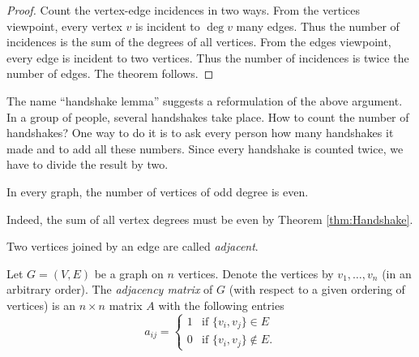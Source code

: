 \begin{page}
\setcounter{section}{1}
\setcounter{subsection}{4}
\setcounter{dfn}{10}
\label{portion:207}

\begin{proof}
Count the vertex-edge incidences in two ways.
From the vertices viewpoint, every vertex $v$ is incident to $\deg v$ many edges.
Thus the number of incidences is the sum of the degrees of all vertices.
From the edges viewpoint, every edge is incident to two vertices.
Thus the number of incidences is twice the number of edges.
The theorem follows.
\end{proof}
The name ``handshake lemma'' suggests a reformulation of the above argument.
In a group of people, several handshakes take place. How to count the number of handshakes?
One way to do it is to ask every person how many handshakes it made and to add all these numbers.
Since every handshake is counted twice, we have to divide the result by two.


\end{page}

\begin{page}
\setcounter{section}{1}
\setcounter{subsection}{4}
\setcounter{dfn}{11}
\label{portion:209}

\begin{cor}
In every graph, the number of vertices of odd degree is even.
\end{cor}

\end{page}

\begin{page}
\setcounter{section}{1}
\setcounter{subsection}{4}
\setcounter{dfn}{11}
\label{portion:210}

Indeed, the sum of all vertex degrees must be even by Theorem \ref{thm:Handshake}.

Two vertices joined by an edge are called \emph{adjacent}.


\end{page}

\begin{page}
\setcounter{section}{1}
\setcounter{subsection}{4}
\setcounter{dfn}{12}
\label{portion:212}

\begin{dfn}
Let $G = (V, E)$ be a graph on $n$ vertices.
Denote the vertices by $v_1, \ldots, v_n$ (in an arbitrary order).
The \emph{adjacency matrix} of $G$ (with respect to a given ordering of vertices) is an $n \times n$ matrix $A$ with the following entries
\[
a_{ij} =
\begin{cases}
1 &\text{if } \{v_i, v_j\} \in E\\
0 &\text{if } \{v_i, v_j\} \notin E.
\end{cases}
\]
\end{dfn}

\end{page}

